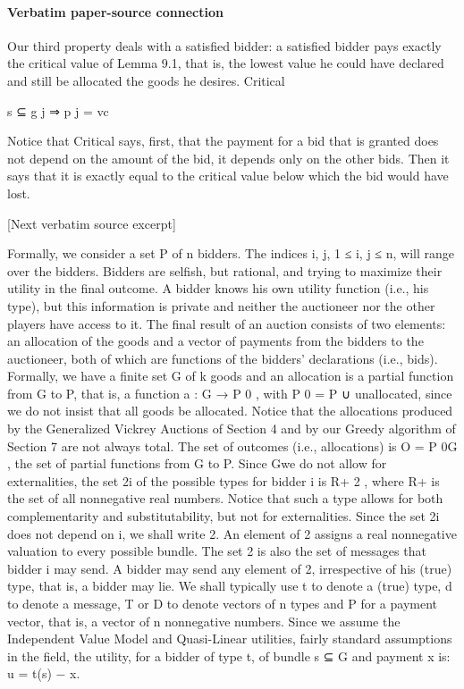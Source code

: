 \documentclass[10pt]{article}
\begin{document}
\paragraph{Verbatim paper-source connection}
\begin{ReviewVerbatim}
Our third property deals with a satisfied bidder: a satisfied bidder pays exactly
the critical value of Lemma 9.1, that is, the lowest value he could have declared
and still be allocated the goods he desires.
Critical

s ⊆ g j ⇒ p j = vc

Notice that Critical says, first, that the payment for a bid that is granted does not
depend on the amount of the bid, it depends only on the other bids. Then it says
that it is exactly equal to the critical value below which the bid would have lost.

[Next verbatim source excerpt]

Formally, we consider a set P of n bidders. The indices i, j, 1 ≤ i, j ≤ n, will
range over the bidders. Bidders are selfish, but rational, and trying to maximize their
utility in the final outcome. A bidder knows his own utility function (i.e., his type),
but this information is private and neither the auctioneer nor the other players have
access to it. The final result of an auction consists of two elements: an allocation
of the goods and a vector of payments from the bidders to the auctioneer, both of
which are functions of the bidders’ declarations (i.e., bids). Formally, we have a
finite set G of k goods and an allocation is a partial function from G to P, that is, a
function a : G → P 0 , with P 0 = P ∪ {unallocated}, since we do not insist that all
goods be allocated. Notice that the allocations produced by the Generalized Vickrey
Auctions of Section 4 and by our Greedy algorithm of Section 7 are not always
total. The set of outcomes (i.e., allocations) is O = P 0G , the set of partial functions
from G to P. Since Gwe do not allow for externalities, the set 2i of the possible types
for bidder i is R+ 2 , where R+ is the set of all nonnegative real numbers. Notice
that such a type allows for both complementarity and substitutability, but not for
externalities. Since the set 2i does not depend on i, we shall write 2. An element
of 2 assigns a real nonnegative valuation to every possible bundle. The set 2 is
also the set of messages that bidder i may send. A bidder may send any element of
2, irrespective of his (true) type, that is, a bidder may lie. We shall typically use t
to denote a (true) type, d to denote a message, T or D to denote vectors of n types
and P for a payment vector, that is, a vector of n nonnegative numbers.
Since we assume the Independent Value Model and Quasi-Linear utilities, fairly
standard assumptions in the field, the utility, for a bidder of type t, of bundle s ⊆ G
and payment x is:
u = t(s) − x.


\end{ReviewVerbatim}
\end{document}
